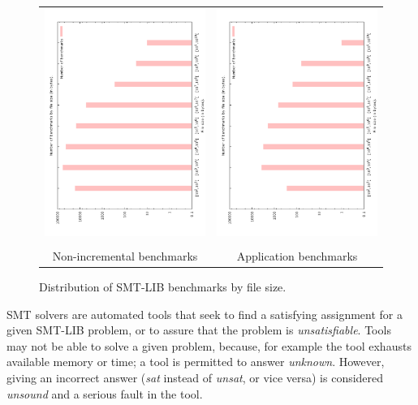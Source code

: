 \documentclass[twoside,11pt]{article}
\begin{document}
\begin{figure}
\begin{center}
\begin{tabular}{cc}
\includegraphics[angle=270,width=.5\textwidth]{smtlib2-file-count-by-size.pdf}
&
\includegraphics[angle=270,width=.5\textwidth]{smtlib2-app-file-count-by-size.pdf}
\\
\\
Non-incremental benchmarks & Application benchmarks
\end{tabular}
\end{center}
\caption{Distribution of SMT-LIB benchmarks by file size.
\label{fig:smtlib-bysize}}
\end{figure}

SMT solvers are automated tools that seek to find a satisfying assignment for a given SMT-LIB problem, or to assure that the problem is \emph{unsatisfiable}.
Tools may not be able to solve a given problem, because, for example the tool exhausts available memory or time; a tool is permitted to answer \emph{unknown}. However, giving an incorrect answer (\emph{sat} instead of \emph{unsat}, or vice versa) is considered \emph{unsound} and a serious fault in the tool.
\end{document}
